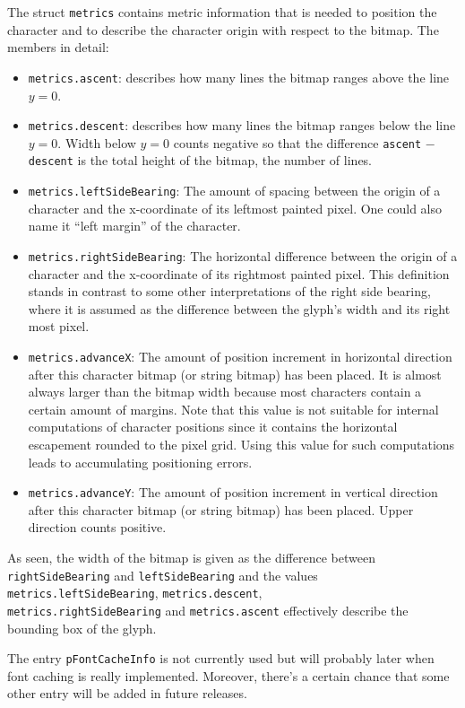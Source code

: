 The struct \verb+metrics+ contains metric information that is needed
to position the character and to describe the character origin
with respect to the bitmap. The members in detail:
\begin{itemize}
\item \verb+metrics.ascent+: describes how many lines the bitmap
  ranges above the line $y=0$. 
\item \verb+metrics.descent+: describes how many lines the bitmap
  ranges below the line $y=0$. Width below $y=0$ counts negative so that the
  difference \verb+ascent+ $-$ \verb+descent+ is the
  total height of the bitmap, the number of lines.
\item \verb+metrics.leftSideBearing+: The amount of spacing between
  the origin of a character and the x-coordinate of its leftmost
  painted pixel. One could also name it ``left margin'' of the
  character. 
\item \verb+metrics.rightSideBearing+: The horizontal difference between
  the origin of a character and the x-coordinate of its rightmost
  painted pixel. This definition stands in contrast to some other
  interpretations of the right side bearing, where it is assumed as the
  difference between the glyph's width and its right most pixel.
\item \verb+metrics.advanceX+: The amount of position increment in
  horizontal direction after this character
  bitmap (or string bitmap) has been placed. It is almost always
  larger than the bitmap width because most characters contain a
  certain amount of margins. Note that this value is not suitable for internal
  computations of character positions since it contains the horizontal
  escapement rounded to the pixel grid. Using this value for such computations
  leads to accumulating positioning errors.
\item \verb+metrics.advanceY+: The amount of position increment in
  vertical direction after this character
  bitmap (or string bitmap) has been placed. Upper direction counts positive. 
\end{itemize}
As seen, the width of the bitmap is given as the difference between
\verb+rightSideBearing+ and \verb+leftSideBearing+ and the values
\verb+metrics.leftSideBearing+, \verb+metrics.descent+,\\
\verb+metrics.rightSideBearing+ and \verb+metrics.ascent+ effectively describe
the bounding box of the glyph.

The entry \verb+pFontCacheInfo+ is not currently used but will
probably later when font caching is really
implemented. Moreover, there's a certain chance that some other
entry will be added in future releases.

